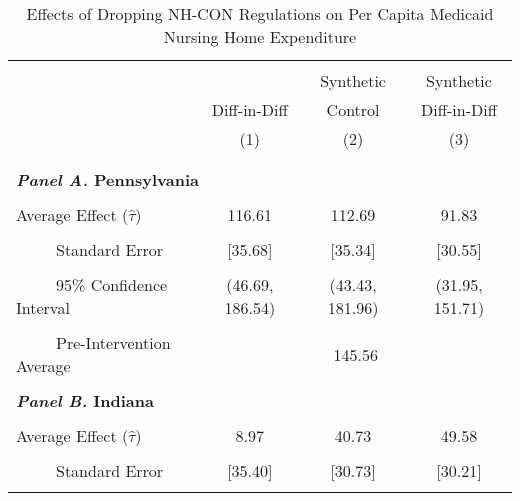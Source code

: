 \documentclass[../Main.tex]{subfiles}
\begin{document}
\newpage
\null
\vfill
\begin{table}[htbp]\centering \footnotesize
\def\sym#1{\ifmmode^{#1}\else\(^{#1}\)\fi}
\captionsetup{width=.8\textwidth}
\caption{\centering Effects of Dropping NH-CON Regulations on Per Capita Medicaid Nursing Home Expenditure}
\label{tab:ave_results_med_exp}
\setlength{\tabcolsep}{10pt}
\begin{tabular}{l*{3}{c}}
\hline\hline
\\[-2ex]
&\multicolumn{1}{c}{}&\multicolumn{1}{c}{Synthetic}&\multicolumn{1}{c}{Synthetic}\\
&\multicolumn{1}{c}{Diff-in-Diff}&\multicolumn{1}{c}{Control}&\multicolumn{1}{c}{Diff-in-Diff}\\
&\multicolumn{1}{c}{(1)}&\multicolumn{1}{c}{(2)}&\multicolumn{1}{c}{(3)}\\
\\[-2ex]
\hline
\\[-.1ex]
\multicolumn{4}{l}{\textbf{\textit{Panel A.} Pennsylvania}}\\
\\[-1.5ex]
\multicolumn{1}{l}{Average Effect ($\hat{\tau}$)}&   \multicolumn{1}{c}{116.61}&   \multicolumn{1}{c}{112.69}&  \multicolumn{1}{c}{91.83}\\
\\[-2ex]
\multicolumn{1}{l}{\ \ \ \ \ Standard Error}  &\multicolumn{1}{c}{[35.68]}&\multicolumn{1}{c}{[35.34]}&\multicolumn{1}{c}{[30.55]}\\
\\[-2ex]
\multicolumn{1}{l}{\ \ \ \ \ 95\% Confidence Interval}&   \multicolumn{1}{c}{(46.69, 186.54)}&   \multicolumn{1}{c}{(43.43, 181.96)}&   \multicolumn{1}{c}{(31.95, 151.71)}\\
\\[-2ex]
\multicolumn{1}{l}{\ \ \ \ \ Pre-Intervention Average}&   \multicolumn{3}{c}{145.56}\\
\\[-.1ex]
\multicolumn{4}{l}{\textbf{\textit{Panel B.} Indiana}}\\
\\[-1.5ex]
\multicolumn{1}{l}{Average Effect ($\hat{\tau}$)}&   \multicolumn{1}{c}{8.97}&   \multicolumn{1}{c}{40.73}&  \multicolumn{1}{c}{49.58}\\
\\[-2ex]
\multicolumn{1}{l}{\ \ \ \ \ Standard Error}  &\multicolumn{1}{c}{[35.40]}&\multicolumn{1}{c}{[30.73]}&\multicolumn{1}{c}{[30.21]}\\
\\[-2ex]

\end{tabular}
\end{table}
\end{document}

